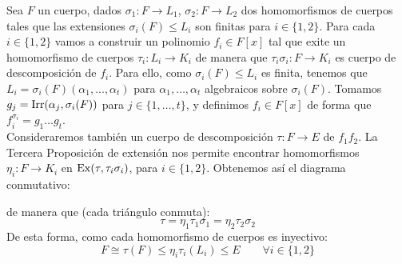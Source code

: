 \begin{observacion}
    \noindent
    Sea $F$ un cuerpo, dados $\sigma_1:F\to L_1$, $\sigma_2:F\to L_2$ dos homomorfismos de cuerpos tales que las extensiones $\sigma_i(F)\leq L_i$ son finitas para $i \in \{1,2\}$. Para cada $i \in \{1,2\}$ vamos a construir un polinomio $f_i \in F[x]$ tal que exite un homomorfismo de cuerpos $\tau_i:L_i\to K_i$ de manera que $\tau_i\sigma_i:F\to K_i$ es cuerpo de descomposición de $f_i$. Para ello, como $\sigma_i(F)\leq L_i$ es finita, tenemos que $L_i = \sigma_i(F)(\alpha_1,...,\alpha_t)$ para $\alpha_1,\ldots,\alpha_t$ algebraicos sobre $\sigma_i(F)$. Tomamos $g_j = \operatorname{Irr}(\alpha_j,\sigma_i(F))$ para $j \in \{1,\ldots,t\}$, y definimos $f_i \in F[x]$ de forma que $f_i^{\sigma_i} = g_1\ldots g_t$.\\

    \noindent
    Consideraremos también un cuerpo de descomposición $\tau:F\to E$ de $f_1f_2$. La Tercera Proposición de extensión nos permite encontrar homomorfismos $\eta_i:F\to K_i$ en $\operatorname{Ex}(\tau,\tau_i\sigma_i)$, para $i \in \{1,2\}$. Obtenemos así el diagrama conmutativo:
    \begin{figure}[H]
        \centering
    \end{figure}
    \noindent
    de manera que (cada triángulo conmuta):
    \begin{equation*}
        \tau = \eta_1\tau_1\sigma_1 = \eta_2\tau_2\sigma_2
    \end{equation*}
    De esta forma, como cada homomorfismo de cuerpos es inyectivo:
    \begin{equation*}
        F \cong \tau(F) \leq \eta_i \tau_i(L_i) \leq E \qquad \forall i \in \{1,2\}
    \end{equation*}
\end{observacion}

